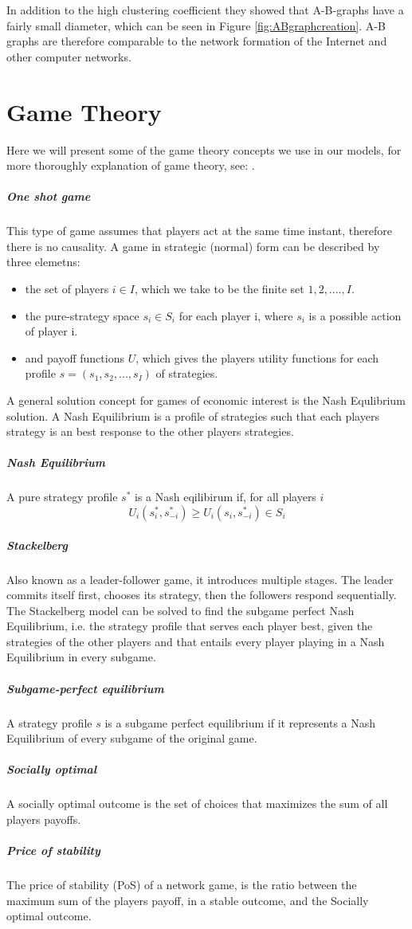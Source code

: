 In addition to the high clustering coefficient they showed that A-B-graphs have a fairly small diameter,
 which can be seen in Figure \ref{fig:ABgraphcreation}. 
 A-B graphs are therefore comparable to the network formation of the Internet and other computer networks. 






\section{Game Theory}
Here we will present some of the game theory concepts we use in our models, for more thoroughly explanation of game theory, see: \cite{nisan2007algorithmic}.
\subparagraph{One shot game}
This type of game assumes that players act at the same time instant, therefore there is no causality. A game in strategic (normal) form can be described by three elemetns:
\begin{itemize}
\item the set of players $i \in I$, which we take to be the finite set ${1,2,....,I}$.
\item the pure-strategy space $s_{i}\in S_{i}$ for each player i, where $s_{i}$ is a possible action of player i.
\item and payoff functions $U$, which gives the players utility functions for each profile $s=(s_{1},s_{2},...,s_{I})$ of strategies.
\end{itemize}
A general solution concept for games of economic interest is the Nash Equlibrium solution. A Nash Equilibrium is a profile of strategies such that each players strategy is an best response to the other players strategies. 
\subparagraph{Nash Equilibrium}
A pure strategy profile $s^{*}$ is a Nash eqilibirum if, for all players $i$
\begin{equation}
U_{i}(s^{*}_{i},s_{-i}^{*})\geq U_{i}(s_{i},s^{*}_{-i}) \in S_{i}
\end{equation}
\subparagraph{Stackelberg}
Also known as a leader-follower game, it introduces multiple stages. The leader commits itself first, chooses its strategy, then the followers respond sequentially. The Stackelberg model can be solved to find the subgame perfect Nash Equilibrium, i.e. the strategy profile that serves each player best, given the strategies of the other players and that entails every player playing in a Nash Equilibrium in every subgame.
\subparagraph{Subgame-perfect equilibrium}
A strategy profile $s$ is a subgame perfect equilibrium if it represents a Nash Equilibrium of every subgame of the original game.
\subparagraph{Socially optimal}
A socially optimal outcome is the set of choices that maximizes the sum of all players payoffs. 
\subparagraph{Price of stability}
The price of stability (PoS) of a network game, is the ratio between the maximum sum of the players payoff, in a stable outcome, and the Socially optimal outcome.

